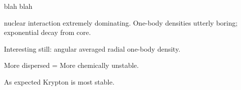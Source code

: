  blah blah
 
 nuclear interaction extremely dominating. One-body densities utterly boring; exponential decay from core.
 
 Interesting still: angular averaged radial one-body density.

 More dispersed = More chemically unstable. 
 
 As expected Krypton is most stable.
 
 
\begin{figure}
 \begin{center}
     \\

\end{center}
\end{figure}
